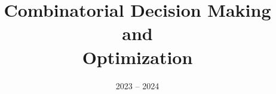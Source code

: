 \documentclass[11pt]{ainotes}
\title{Combinatorial Decision Making\\and\\Optimization}
\date{2023 -- 2024}
\begin{document}
    
    \makenotesfront
    
    
\end{document}
